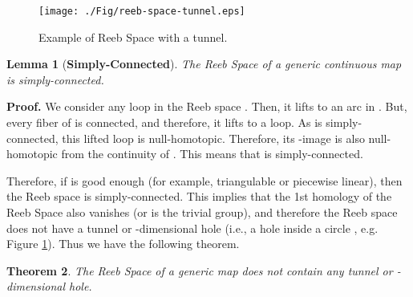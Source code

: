 \documentclass[twocolumn]{article}
\newtheorem{theorem}{Theorem}[section]
\newtheorem{lemma}[theorem]{Lemma}
\newcommand{\figref}[1]{Figure \ref{fig:#1}}
\renewenvironment{proof}{{\bf Proof. }}{\hspace*{\fill}\bigskip\noindent}
\begin{document}
\begin{figure}[t!]
\begin{center}
\texttt{[image: ./Fig/reeb-space-tunnel.eps]}
\caption{Example of Reeb Space with a tunnel.}
\label{fig:reeb-tunnel}
\end{center}
\end{figure} 


\begin{lemma}[\textbf{Simply-Connected}]
\label{lem:contractible}
The Reeb Space of a generic continuous map  is simply-connected.
\end{lemma}
\noindent
\begin{proof} We consider any loop 
in the Reeb space . Then, it lifts to an arc
in . But, every fiber of  is connected,
and therefore, it lifts to a loop.
As  is simply-connected, this lifted loop
is null-homotopic. Therefore, its -image
is also null-homotopic from the continuity of . This means that 
is simply-connected. 
\end{proof}

\noindent
Therefore, if  is good enough (for example,
triangulable or piecewise linear), then the Reeb space
is simply-connected. This implies that the 1st homology of the Reeb
Space also vanishes (or is the trivial group),
and therefore the Reeb space does not have a tunnel or -dimensional
hole (i.e., a hole inside a circle , e.g. \figref{reeb-tunnel}). Thus we
have the following theorem.
\begin{theorem}
\label{thm:tunnel}
The Reeb Space of a generic map  does not contain any
tunnel or -dimensional hole.
\end{theorem}
\end{document}
